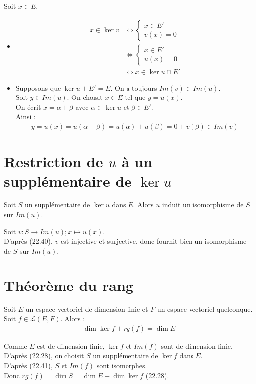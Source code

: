 \documentclass[../main.tex]{subfiles}
\begin{document}
\noindent Soit $x\in E$. 
\begin{itemize}
    \item \begin{align*}
        x \in \ker v &\Leftrightarrow \begin{cases}
            x \in E' \\
            v(x) = 0
        \end{cases} \\
        &\Leftrightarrow \begin{cases}
            x \in E' \\
            u(x) = 0
        \end{cases} \\
        &\Leftrightarrow x \in \ker u \cap E'
    \end{align*}

    \item Supposons que $\ker u + E' = E$. On a toujours $Im(v) \subset Im(u)$. \\
    Soit $y\in Im(u)$. On choisit $x\in E$ tel que $y = u(x)$. \\
    On écrit $x = \alpha + \beta$ avec $\alpha \in \ker u$ et $\beta \in E'$. \\
    Ainsi :
    \begin{align*}
        y = u(x) = u(\alpha  + \beta) = u(\alpha) + u(\beta) = 0 + v(\beta) \in Im(v)
    \end{align*}
\end{itemize}

\section{Restriction de $u$ à un supplémentaire de $\ker u$}
\begin{tcolorbox}[title=Corollaire 22.41, title filled=false, colframe=orange, colback=orange!10!white]
    Soit $S$ un supplémentaire de $\ker u$ dans $E$. Alors $u$ induit un isomorphisme de $S$ sur $Im(u)$. 
\end{tcolorbox}

\noindent Soit $v:S\to Im(u); x\mapsto u(x)$. \\
D'après (22.40), $v$ est injective et surjective, donc fournit bien un isomorphisme de $S$ sur $Im(u)$.

\section{Théorème du rang}
\begin{tcolorbox}[title=Théorème 22.43, title filled=false, colframe=orange, colback=orange!10!white]
    Soit $E$ un espace vectoriel de dimension finie et $F$ un espace vectoriel quelconque. Soit $f\in \mathcal{L}(E, F)$. Alors : 
    \begin{align*}
        \dim \ker f + rg(f) = \dim E
    \end{align*}
\end{tcolorbox}

\noindent Comme $E$ est de dimension finie, $\ker f$ et $Im(f)$ sont de dimension finie. \\
D'après (22.28), on choisit $S$ un supplémentaire de $\ker f$ dans $E$. \\
D'après (22.41), $S$ et $Im(f)$ sont isomorphes. \\
Donc $rg(f) = \dim S = \dim E - \dim \ker f$ (22.28). 
\end{document}
